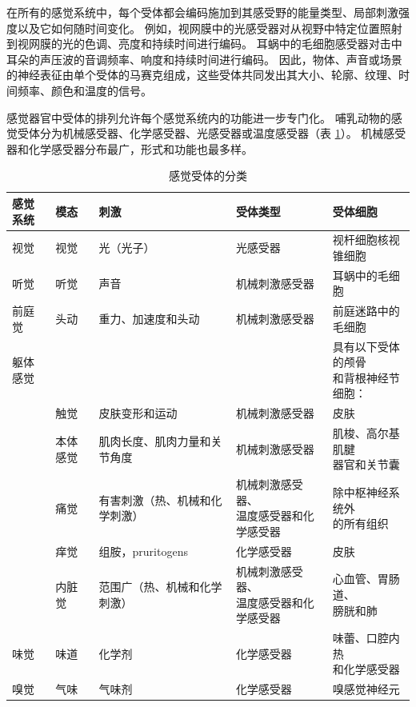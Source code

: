 在所有的感觉系统中，每个受体都会编码施加到其感受野的能量类型、局部刺激强度以及它如何随时间变化。
例如，视网膜中的光感受器对从视野中特定位置照射到视网膜的光的色调、亮度和持续时间进行编码。
耳蜗中的毛细胞感受器对击中耳朵的声压波的音调频率、响度和持续时间进行编码。
因此，物体、声音或场景的神经表征由单个受体的马赛克组成，这些受体共同发出其大小、轮廓、纹理、时间频率、颜色和温度的信号。


感觉器官中受体的排列允许每个感觉系统内的功能进一步专门化。 
哺乳动物的感觉受体分为机械感受器、化学感受器、光感受器或温度感受器（表 \ref{tab:17_1}）。
机械感受器和化学感受器分布最广，形式和功能也最多样。

\begin{table}[htbp]
	\centering
	\caption{感觉受体的分类}
	\begin{tabular}{lllll}
		\toprule
		感觉系统 & 模态 & 刺激 & 受体类型 & 受体细胞 \\
		\midrule
		视觉 & 视觉 & 光（光子）   & 光感受器 & 视杆细胞核视锥细胞\\
		听觉 & 听觉 & 声音   & 机械刺激感受器 & 耳蜗中的毛细胞 \\
		前庭觉 & 头动 & 重力、加速度和头动   & 机械刺激感受器 & 前庭迷路中的毛细胞 \\
		躯体感觉 &  &   &  & \makecell{具有以下受体的颅骨 \\ 和背根神经节细胞：} \\
		 & 触觉 & 皮肤变形和运动   & 机械刺激感受器 & 皮肤 \\
		 & 本体感觉 & 肌肉长度、肌肉力量和关节角度   & 机械刺激感受器 & \makecell{肌梭、高尔基肌腱 \\ 器官和关节囊}  \\
		 & 痛觉 & 有害刺激（热、机械和化学刺激）  & \makecell{机械刺激感受器、 \\ 温度感受器和化学感受器}  & \makecell{除中枢神经系统外 \\ 的所有组织}  \\
		 & 痒觉 & 组胺，pruritogens  & 化学感受器 & 皮肤 \\
		 & 内脏觉 & 范围广（热、机械和化学刺激）  & \makecell{机械刺激感受器、 \\ 温度感受器和化学感受器} & \makecell{心血管、胃肠道、 \\ 膀胱和肺}  \\
		味觉 & 味道 & 化学剂   & 化学感受器 & \makecell{味蕾、口腔内热 \\ 和化学感受器}  \\
		嗅觉 & 气味 & 气味剂   & 化学感受器 & 嗅感觉神经元 \\
		\bottomrule
	\end{tabular}%
	\label{tab:17_1}%
\end{table}%


